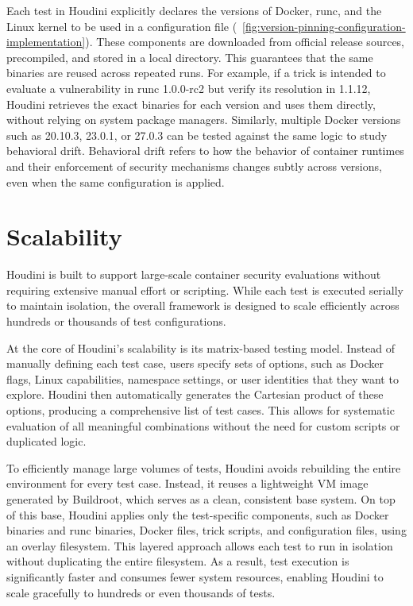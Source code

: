 \documentclass[12pt]{report}
\begin{document}
\begin{doublespace}
Each test in Houdini explicitly declares the versions of Docker, runc, and the Linux kernel to be used in a configuration file (~\ref{fig:version-pinning-configuration-implementation}). These components are downloaded from official release sources, precompiled, and stored in a local directory. This guarantees that the same binaries are reused across repeated runs. For example, if a trick is intended to evaluate a vulnerability in runc 1.0.0-rc2 but verify its resolution in 1.1.12, Houdini retrieves the exact binaries for each version and uses them directly, without relying on system package managers. Similarly, multiple Docker versions such as 20.10.3, 23.0.1, or 27.0.3 can be tested against the same logic to study behavioral drift. Behavioral drift refers to how the behavior of container runtimes and their enforcement of security mechanisms changes subtly across versions, even when the same configuration is applied.


\section{Scalability}

Houdini is built to support large-scale container security evaluations without requiring extensive manual effort or scripting. While each test is executed serially to maintain isolation, the overall framework is designed to scale efficiently across hundreds or thousands of test configurations.

At the core of Houdini’s scalability is its matrix-based testing model. Instead of manually defining each test case, users specify sets of options, such as Docker flags, Linux capabilities, namespace settings, or user identities that they want to explore. Houdini then automatically generates the Cartesian product of these options, producing a comprehensive list of test cases. This allows for systematic evaluation of all meaningful combinations without the need for custom scripts or duplicated logic.

To efficiently manage large volumes of tests, Houdini avoids rebuilding the entire environment for every test case. Instead, it reuses a lightweight VM image generated by Buildroot, which serves as a clean, consistent base system. On top of this base, Houdini applies only the test-specific components, such as Docker binaries and runc binaries, Docker files, trick scripts, and configuration files, using an overlay filesystem. This layered approach allows each test to run in isolation without duplicating the entire filesystem. As a result, test execution is significantly faster and consumes fewer system resources, enabling Houdini to scale gracefully to hundreds or even thousands of tests. 


\end{doublespace}
\end{document}
